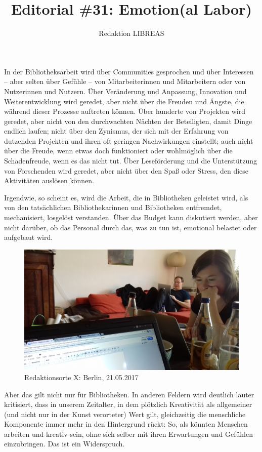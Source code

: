 \documentclass[a4paper,
fontsize=11pt,
oneside,
numbers=noperiodatend,
parskip=half-,
bibliography=totoc,
final
]{scrartcl}
\title{\LARGE{Editorial \#31: Emotion(al Labor)}} %
\author{Redaktion LIBREAS} %
\date{}
\begin{document}
\maketitle
\thispagestyle{fancyplain} 


In der Bibliotheksarbeit wird über Communities gesprochen und über
Interessen -- aber selten über Gefühle -- von Mitarbeiterinnen und
Mitarbeitern oder von Nutzerinnen und Nutzern. Über Veränderung und
Anpassung, Innovation und Weiterentwicklung wird geredet, aber nicht
über die Freuden und Ängste, die während dieser Prozesse auftreten
können. Über hunderte von Projekten wird geredet, aber nicht von den
durchwachten Nächten der Beteiligten, damit Dinge endlich laufen; nicht
über den Zynismus, der sich mit der Erfahrung von dutzenden Projekten
und ihren oft geringen Nachwirkungen einstellt; auch nicht über die
Freude, wenn etwas doch funktioniert oder wohlmöglich über die
Schadenfreude, wenn es das nicht tut. Über Leseförderung und die
Unterstützung von Forschenden wird geredet, aber nicht über den Spaß
oder Stress, den diese Aktivitäten auslösen können.

Irgendwie, so scheint es, wird die Arbeit, die in Bibliotheken geleistet
wird, als von den tatsächlichen Bibliothekarinnen und Bibliotheken
entfremdet, mechanisiert, losgelöst verstanden. Über das Budget kann
diskutiert werden, aber nicht darüber, ob das Personal durch das, was zu
tun ist, emotional belastet oder aufgebaut wird.

\begin{figure}
\centering
\includegraphics{Editorial-1.jpg}
\caption{Redaktionsorte X: Berlin, 21.05.2017}
\end{figure}

Aber das gilt nicht nur für Bibliotheken. In anderen Feldern wird
deutlich lauter kritisiert, dass in unserem Zeitalter, in dem plötzlich
Kreativität als allgemeiner (und nicht nur in der Kunst verorteter) Wert
gilt, gleichzeitig die menschliche Komponente immer mehr in den
Hintergrund rückt: So, als könnten Menschen arbeiten und kreativ sein,
ohne sich selber mit ihren Erwartungen und Gefühlen einzubringen. Das
ist ein Widerspruch.
\end{document}
